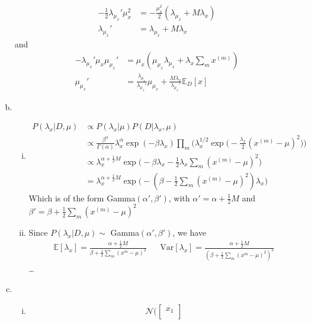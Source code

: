 \documentclass{article}
\begin{document}
\begin{enumerate}[(a)]
\begin{align*}
        -\frac{1}{2}\lambda_{\mu_x}'\mu_x^2 &= - \frac{\mu_x^2}{2}(\lambda_{\mu_x} + M\lambda_x) \\
        \lambda_{\mu_x}' &= \lambda_{\mu_x} + M\lambda_x
    \end{align*} and 
    \begin{align*}
        - \lambda_{\mu_x}' \mu_x \mu_{\mu_x}' &= \mu_x (\mu_{\mu_x}\lambda_{\mu_x} + \lambda_x\sum_m x^{(m)})\\
        \mu_{\mu_x}' &= \frac{\lambda_{\mu_x}}{\lambda_{\mu_x}'}\mu_{\mu_x} + \frac{M\lambda_x}{\lambda_{\mu_x}'}\mathbb{E}_D[x]
    \end{align*}
    \item \begin{enumerate}[(i)]
        \item \begin{align*}
            P(\lambda_x | D, \mu) &\propto P(\lambda_x|\mu)P(D|\lambda_x, \mu) \\
            &\propto \frac{\beta^{\alpha}}{\Gamma(\alpha)}\lambda_x^{\alpha}\exp(-\beta\lambda_x) \prod_m \biggl(\lambda_x^{1/2}\exp\bigg(-\frac{\lambda_x}{2}(x^{(m)} - \mu)^2\bigg)\biggr) \\ 
            &\propto \lambda_x^{\alpha + \frac{1}{2}M}\exp\biggl(-\beta\lambda_x - \frac{1}{2}\lambda_x\sum_m(x^{(m)} - \mu)^2\biggr) \\
            &= \lambda_x^{\alpha + \frac{1}{2}M}\exp\biggl(-(\beta - \frac{1}{2}\sum_m(x^{(m)} - \mu)^2)\lambda_x\biggr) 
        \end{align*}
        Which is of the form Gamma$(\alpha', \beta')$, with $\alpha' = \alpha + \frac{1}{2}M$ and $\beta' = \beta + \frac{1}{2}\sum_{m}(x^{(m)} - \mu)^2$
        \item Since $P(\lambda_x | D, \mu) \sim $ Gamma$(\alpha', \beta')$, we have
        \begin{align*}
            \mathbb{E}[\lambda_x] = \frac{\alpha + \frac{1}{2}M}{\beta + \frac{1}{2}\sum_m(x^m - \mu)^2} & & \text{Var}[\lambda_x] = \frac{\alpha + \frac{1}{2}M}{(\beta + \frac{1}{2}\sum_m(x^m - \mu)^2)^2}
        \end{align*}
        \dots
    \end{enumerate}
    \item
    \begin{enumerate}[(i)]
    \item \begin{align*}
        \mathcal{N}\biggl(\begin{bmatrix}
            x_1 \\

\end{bmatrix}
\end{align*}
\end{enumerate}
\end{enumerate}
\end{document}
